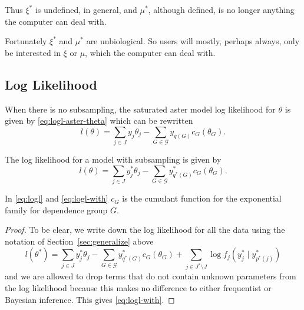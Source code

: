 Thus $\xi^*$ is undefined, in general, and $\mu^*$, although defined,
is no longer anything the computer can deal with.

Fortunately $\xi^*$ and $\mu^*$ are unbiological.  So users will mostly,
perhaps always, only be interested in $\xi$ or $\mu$, which the computer
can deal with.

\subsection{Log Likelihood}
\label{sec:logl}

When there is no subsampling, the saturated aster model log likelihood
for $\theta$ is given by \eqref{eq:logl-aster-theta} which can be rewritten
\begin{equation} \label{eq:logl}
   l(\theta)
   =
   \sum_{j \in J} y_j \theta_j
   - \sum_{G \in \mathcal{G}} y_{q(G)} c_G(\theta_G).
\end{equation}

\begin{theorem} \label{th:logl-theta}
The log likelihood for a model with subsampling is given by
\begin{equation} \label{eq:logl-with}
   l(\theta)
   =
   \sum_{j \in J} y^*_j \theta_j
   - \sum_{G \in \mathcal{G}} y^*_{q^*(G)} c_G(\theta_G).
\end{equation}
\end{theorem}
In \eqref{eq:logl} and \eqref{eq:logl-with}
$c_G$ is the cumulant function for the exponential family
for dependence group $G$.
\begin{proof}
To be clear, we write down the log likelihood for all the data
using the notation of Section~\ref{sec:generalize} above
$$
   l(\theta^*)
   =
   \sum_{j \in J} y_j^* \theta_j
   - \sum_{G \in \mathcal{G}} y_{q^*(G)}^* c_G(\theta_G)
   +
   \sum_{j \in J^* \setminus J} \log f_j(y_j^* \mid y_{p^*(j)}^*)
$$
and we are allowed to drop terms that do not contain unknown parameters from the
log likelihood because this makes no difference to either frequentist or
Bayesian inference.  This gives \eqref{eq:logl-with}.
\end{proof}

